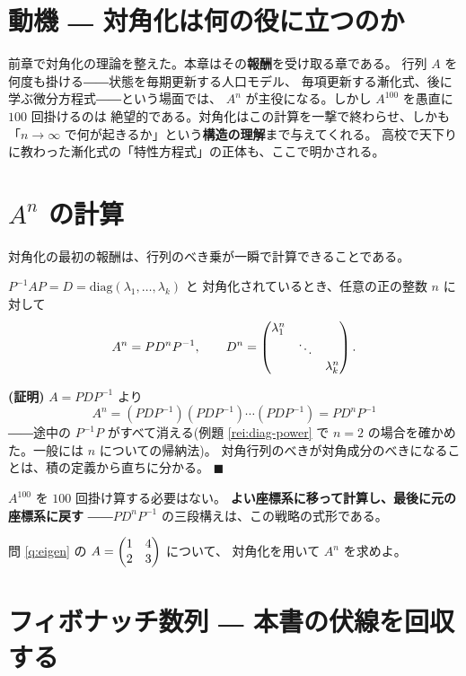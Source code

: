 \section{動機 ― 対角化は何の役に立つのか}

前章で対角化の理論を整えた。本章はその\textbf{報酬}を受け取る章である。
行列 $A$ を何度も掛ける――状態を毎期更新する人口モデル、
毎項更新する漸化式、後に学ぶ微分方程式――という場面では、
$A^n$ が主役になる。しかし $A^{100}$ を愚直に $100$ 回掛けるのは
絶望的である。対角化はこの計算を一撃で終わらせ、しかも
「$n \to \infty$ で何が起きるか」という\textbf{構造の理解}まで与えてくれる。
高校で天下りに教わった漸化式の「特性方程式」の正体も、ここで明かされる。

\section{$A^n$ の計算}

対角化の最初の報酬は、行列のべき乗が一瞬で計算できることである。

\begin{teiri}[べき乗の公式]\label{thm:power-formula}
$P^{-1}AP = D = \mathrm{diag}(\lambda_1, \dots, \lambda_k)$ と
対角化されているとき、任意の正の整数 $n$ に対して
\[
A^n = P D^n P^{-1}, \qquad
D^n = \begin{pmatrix}\lambda_1^n & & \\ & \ddots & \\ & & \lambda_k^n\end{pmatrix}.
\]
\end{teiri}

\noindent\textbf{(証明)}\quad
$A = PDP^{-1}$ より
\[
A^n = (PDP^{-1})(PDP^{-1})\cdots(PDP^{-1}) = P D^n P^{-1}
\]
――途中の $P^{-1}P$ がすべて消える(例題 \ref{rei:diag-power} で
$n = 2$ の場合を確かめた。一般には $n$ についての帰納法)。
対角行列のべきが対角成分のべきになることは、積の定義から直ちに分かる。
$\blacksquare$

$A^{100}$ を $100$ 回掛け算する必要はない。
\textbf{よい座標系に移って計算し、最後に元の座標系に戻す}
――$PD^nP^{-1}$ の三段構えは、この戦略の式形である。

\begin{mondai}\label{q:power}
問 \ref{q:eigen} の $A = \begin{pmatrix}1 & 4 \\ 2 & 3\end{pmatrix}$ について、
対角化を用いて $A^n$ を求めよ。
\end{mondai}

\section{フィボナッチ数列 ― 本書の伏線を回収する}

